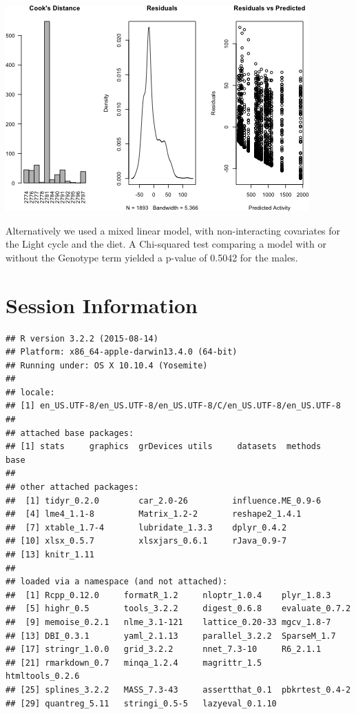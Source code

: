 \documentclass[]{article}
\begin{document}
\includegraphics{figures/activity-statistics-1.png}

Alternatively we used a mixed linear model, with non-interacting
covariates for the Light cycle and the diet. A Chi-squared test
comparing a model with or without the Genotype term yielded a p-value of
0.5042 for the males.

\section{Session Information}\label{session-information}

\begin{verbatim}
## R version 3.2.2 (2015-08-14)
## Platform: x86_64-apple-darwin13.4.0 (64-bit)
## Running under: OS X 10.10.4 (Yosemite)
## 
## locale:
## [1] en_US.UTF-8/en_US.UTF-8/en_US.UTF-8/C/en_US.UTF-8/en_US.UTF-8
## 
## attached base packages:
## [1] stats     graphics  grDevices utils     datasets  methods   base     
## 
## other attached packages:
##  [1] tidyr_0.2.0        car_2.0-26         influence.ME_0.9-6
##  [4] lme4_1.1-8         Matrix_1.2-2       reshape2_1.4.1    
##  [7] xtable_1.7-4       lubridate_1.3.3    dplyr_0.4.2       
## [10] xlsx_0.5.7         xlsxjars_0.6.1     rJava_0.9-7       
## [13] knitr_1.11        
## 
## loaded via a namespace (and not attached):
##  [1] Rcpp_0.12.0     formatR_1.2     nloptr_1.0.4    plyr_1.8.3     
##  [5] highr_0.5       tools_3.2.2     digest_0.6.8    evaluate_0.7.2 
##  [9] memoise_0.2.1   nlme_3.1-121    lattice_0.20-33 mgcv_1.8-7     
## [13] DBI_0.3.1       yaml_2.1.13     parallel_3.2.2  SparseM_1.7    
## [17] stringr_1.0.0   grid_3.2.2      nnet_7.3-10     R6_2.1.1       
## [21] rmarkdown_0.7   minqa_1.2.4     magrittr_1.5    htmltools_0.2.6
## [25] splines_3.2.2   MASS_7.3-43     assertthat_0.1  pbkrtest_0.4-2 
## [29] quantreg_5.11   stringi_0.5-5   lazyeval_0.1.10
\end{verbatim}
\end{document}
